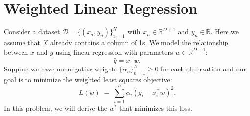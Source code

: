 \documentclass[11pt]{article}
\begin{document}
\newpage


\section{Weighted Linear Regression}

Consider a dataset $\mathcal{D} = \{(x_n, y_n)\}_{n=1}^N$ with $x_n \in \mathbb{R}^{D+1}$ and $y_n \in \mathbb{R}$.  Here we assume that $X$ already contains a column of 1s.
    We model the relationship between $x$ and $y$ using linear regression with parameters $w \in \mathbb{R}^{D+1}$:  
    \[
    \hat{y} = x^\top w.
    \]
    Suppose we have nonnegative weights $\{\alpha_n\}_{n=1}^N \ge 0$ for each observation and our goal is to minimize the weighted least squares objective:
    \[
              L(w) \;=\; \sum_{i=1}^n \alpha_i (y_i - x_i^\top w)^2.
    \]
    In this problem, we will derive the $w^\ast$ that minimizes this loss.
\end{document}
